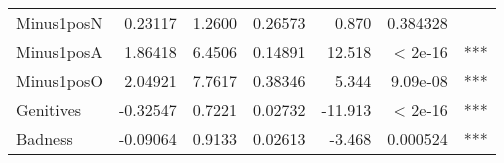 \begin{frame}
{\begin{tabular}{lrrrrrc}
		Minus1posN         &   0.23117& 1.2600 &  0.26573&   0.870& 0.384328&    \\
		Minus1posA         &   1.86418& 6.4506 &  0.14891&  12.518&  < 2e-16& ***\\
		Minus1posO         &   2.04921& 7.7617 &  0.38346&   5.344& 9.09e-08& ***\\
		Genitives          &  -0.32547& 0.7221 &  0.02732& -11.913&  < 2e-16& ***\\
		Badness            &  -0.09064& 0.9133 &  0.02613&  -3.468& 0.000524& ***\\
	\hline
	\end{tabular}
	}
\end{frame}
%
%
%
